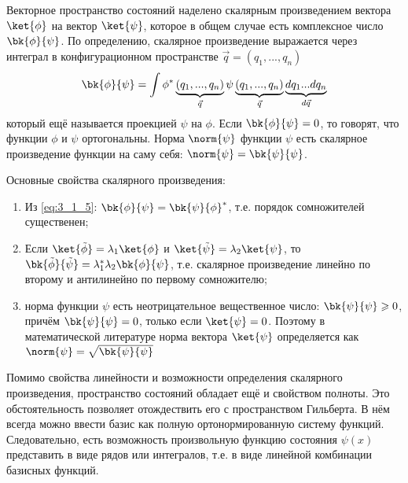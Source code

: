Векторное пространство состояний наделено скалярным произведением вектора $\ket{\phi}$ на вектор $\ket{\psi}$, которое в общем случае есть комплексное число $\bk{\phi}{\psi}$. По определению, скалярное произведение выражается через интеграл в конфигурационном пространстве $\vec{q} = (q_1, ..., q_n)$%
%
\begin{equation}
\label{eq:3_1_5}
\bk{\phi}{\psi} = \int \phi^*\underbrace{(q_1, ..., q_n)}_{\vec{q}} \psi\underbrace{(q_1, ..., q_n)}_{\vec{q}} \underbrace{d q_1 ... d q_n}_{d\vec{q}}
\end{equation}%
%
который ещё называется проекцией $\psi$ на $\phi$. Если $\bk{\phi}{\psi} = 0$, то говорят, что функции $\phi$ и $\psi$ ортогональны. Норма $\norm{\psi}$ функции $\psi$ есть скалярное произведение функции на саму себя: $\norm{\psi} = \bk{\psi}{\psi}$.

Основные свойства скалярного произведения:%
%
\begin{enumerate}
  \item Из \eqref{eq:3_1_5}: $\bk{\phi}{\psi} = \bk{\psi}{\phi}^*$, т.е. порядок сомножителей существенен;
%
  \item Если $\ket{\tilde{\phi}} = \lambda_1\ket{\phi}$ и $\ket{\tilde{\psi}} = \lambda_2\ket{\psi}$, то $\bk{\tilde{\phi}}{\tilde{\psi}} = \lambda_1^* \lambda_2 \bk{\phi}{\psi}$, т.е. скалярное произведение линейно по второму и антилинейно по первому сомножителю;
%
  \item норма функции $\psi$ есть неотрицательное вещественное число: $\bk{\psi}{\psi} \geqslant 0$, причём $\bk{\psi}{\psi} = 0$, только если $\ket{\psi} = 0$. Поэтому в математической литературе норма вектора $\ket{\psi}$ определяется как $\norm{\psi} = \sqrt{\bk{\psi}{\psi}}$
\end{enumerate}

Помимо свойства линейности и возможности определения скалярного произведения, пространство состояний обладает ещё и свойством полноты. Это обстоятельность позволяет отождествить его с пространством Гильберта\footnotemark{}. В нём всегда можно ввести базис как полную ортонормированную систему функций. Следовательно, есть возможность произвольную функцию состояния $\psi(x)$ представить в виде рядов или интегралов, т.е. в виде линейной комбинации базисных функций.

